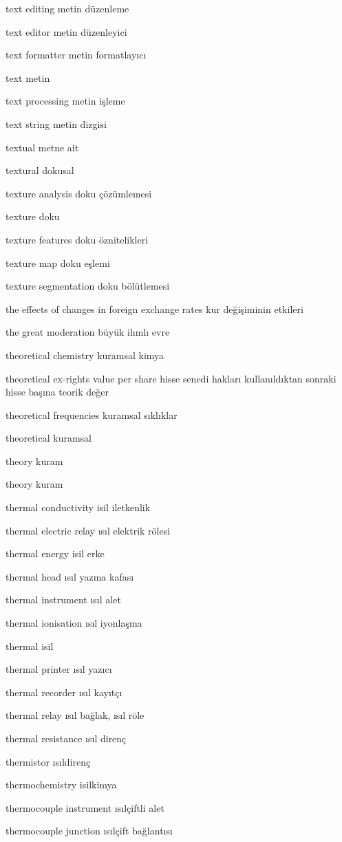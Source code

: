 \documentclass[12pt,fleqn]{article}\usepackage{../../common}
\begin{document}
text editing metin düzenleme

text editor metin düzenleyici

text formatter metin formatlayıcı

text metin

text processing metin işleme

text string metin dizgisi

textual metne ait

textural dokusal

texture analysis doku çözümlemesi

texture doku

texture features doku öznitelikleri

texture map doku eşlemi

texture segmentation doku bölütlemesi

the effects of changes in foreign exchange rates kur değişiminin etkileri

the great moderation büyük ilımlı evre

theoretical chemistry kuramsal kimya

theoretical ex-rights value per share hisse senedi hakları kullanıldıktan sonraki hisse başına teorik değer

theoretical frequencies kuramsal sıklıklar

theoretical kuramsal

theory kuram

theory kuram

thermal conductivity isil iletkenlik

thermal electric relay ısıl elektrik rölesi

thermal energy isil erke

thermal head ısıl yazma kafası

thermal instrument ısıl alet

thermal ionisation ısıl iyonlaşma

thermal isil

thermal printer ısıl yazıcı

thermal recorder ısıl kayıtçı

thermal relay ısıl bağlak, ısıl röle

thermal resistance ısıl direnç

thermistor ısıldirenç

thermochemistry isilkimya

thermocouple instrument ısılçiftli alet

thermocouple junction ısılçift bağlantısı
\end{document}
